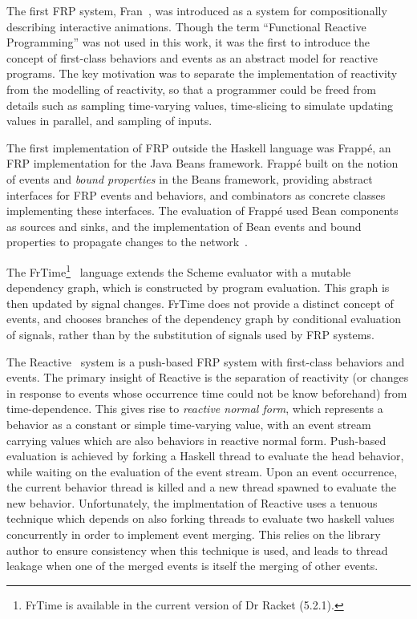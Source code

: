The first FRP system, Fran~\cite{Elliott1997}, was introduced as a system for compositionally describing interactive animations.
Though the term ``Functional Reactive Programming'' was not used in this work, it was the first to introduce the concept of first-class
behaviors and events as an abstract model for reactive programs. The key motivation was to separate the implementation of reactivity
from the modelling of reactivity, so that a programmer could be freed from details such as sampling time-varying values, time-slicing
to simulate updating values in parallel, and sampling of inputs.

The first implementation of FRP outside the Haskell language was Frapp\'{e}, an FRP implementation for the Java Beans framework. Frapp\'{e} built on
the notion of events and {\em bound properties} in the Beans framework, providing abstract interfaces for FRP events and behaviors, and combinators
as concrete classes implementing these interfaces. The evaluation of Frapp\'{e} used Bean components as sources and sinks, and the implementation of
Bean events and bound properties to propagate changes to the network~\cite{Courtney2001-2}.


The FrTime\footnote{FrTime is available in the current version of Dr Racket (5.2.1).}~\cite{Cooper2006} language extends the Scheme evaluator with a mutable
dependency graph, which is constructed by program evaluation. This graph is then updated by signal changes. FrTime does not provide a distinct concept of
events, and chooses branches of the dependency graph by conditional evaluation of signals, rather than by the substitution of signals used by FRP systems.

The Reactive~\cite{Elliott2009} system is a push-based FRP system with first-class behaviors and events. The primary insight of Reactive is
the separation of reactivity (or changes in response to events whose occurrence time could not be know beforehand) from time-dependence. This
gives rise to {\em reactive normal form}, which represents a behavior as a constant or simple time-varying value, with an event stream carrying values
which are also behaviors in reactive normal form. Push-based evaluation is achieved by forking a Haskell thread to evaluate the head behavior,
while waiting on the evaluation of the event stream. Upon an event occurrence, the current behavior thread is killed and a new thread
spawned to evaluate the new behavior. Unfortunately, the implmentation of Reactive uses a tenuous technique which depends on also forking threads to evaluate
two haskell values concurrently in order to implement event merging. This relies on the library author to ensure consistency when this technique is
used, and leads to thread leakage when one of the merged events is itself the merging of other events.

